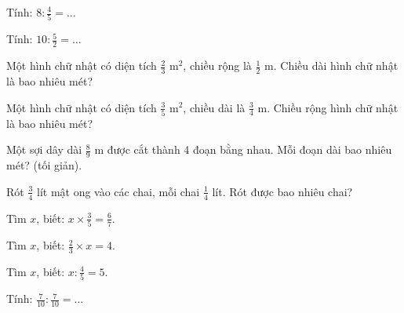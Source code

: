 \begin{ex}
Tính: $8 : \frac{4}{5} = \dots$
\end{ex}

\begin{ex}
Tính: $10 : \frac{5}{2} = \dots$
\end{ex}

\begin{ex}
Một hình chữ nhật có diện tích $\frac{2}{3}\text{ m}^2$, chiều rộng là $\frac{1}{2}$ m. Chiều dài hình chữ nhật là bao nhiêu mét?
\end{ex}

\begin{ex}
Một hình chữ nhật có diện tích $\frac{3}{5}\text{ m}^2$, chiều dài là $\frac{3}{4}$ m. Chiều rộng hình chữ nhật là bao nhiêu mét?
\end{ex}

\begin{ex}
Một sợi dây dài $\frac{8}{9}$ m được cắt thành 4 đoạn bằng nhau. Mỗi đoạn dài bao nhiêu mét? (tối giản).
\end{ex}

\begin{ex}
Rót $\frac{3}{4}$ lít mật ong vào các chai, mỗi chai $\frac{1}{4}$ lít. Rót được bao nhiêu chai?
\end{ex}

\begin{ex}
Tìm $x$, biết: $x \times \frac{3}{5} = \frac{6}{7}$.
\end{ex}

\begin{ex}
Tìm $x$, biết: $\frac{2}{3} \times x = 4$.
\end{ex}

\begin{ex}
Tìm $x$, biết: $x : \frac{4}{5} = 5$.
\end{ex}

\begin{ex}
Tính: $\frac{7}{10} : \frac{7}{10} = \dots$
\end{ex}

